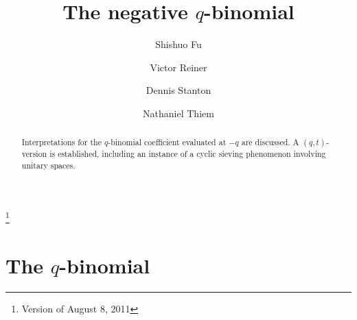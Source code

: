 \documentclass[10pt]{amsart}
\theoremstyle{plain}
\theoremstyle{definition}
\theoremstyle{remark}
\numberwithin{equation}{section}
\begin{document}
\title[The negative $q$-binomial]{The negative $q$-binomial}
\thanks{Version of August 8, 2011}

\author{Shishuo Fu}
\address{Department of Mathematics\\
The Pennsylvania State University\\
University Park, PA 16801}


\author{Victor Reiner}
\address{School of Mathematics\\
University of  Minnesota\\
Minneapolis, MN 55455}


\author{Dennis Stanton}
\address{School of Mathematics\\
University of  Minnesota\\
Minneapolis, MN 55455}


\author{Nathaniel Thiem}
\address{Department of Mathematics\\
University of Colorado at Boulder\\
Boulder, CO 80309}


\begin{abstract} Interpretations for the
$q$-binomial coefficient evaluated at $-q$ are
discussed.  A $(q,t)$-version is established,
including an instance of a cyclic sieving phenomenon
involving unitary spaces.
\end{abstract}

\maketitle




\section{The $q$-binomial}
\end{document}
